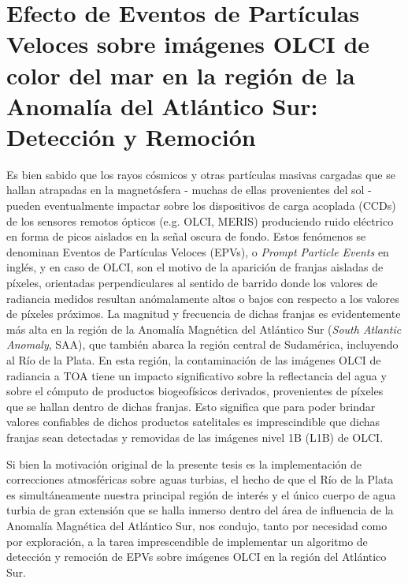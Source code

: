 \chapter[EPVs sobre imágenes OLCI en la SAA]{Efecto de Eventos de Partículas Veloces sobre imágenes OLCI de color del mar en la región de la Anomalía del Atlántico Sur: Detección y Remoción}
\label{ppe}

Es bien sabido que los rayos cósmicos y otras partículas masivas cargadas que se hallan atrapadas en la magnetósfera - muchas de ellas provenientes del sol - pueden eventualmente impactar sobre los dispositivos de carga acoplada (CCDs) de los sensores remotos ópticos (e.g. OLCI, MERIS) produciendo ruido eléctrico en forma de picos aislados en la señal oscura de fondo. Estos fenómenos se denominan Eventos de Partículas Veloces (EPVs), o \textit{Prompt Particle Events} en inglés, y en caso de OLCI, son el motivo de la aparición de franjas aisladas de píxeles, orientadas perpendiculares al sentido de barrido donde los valores de radiancia medidos resultan anómalamente altos o bajos con respecto a los valores de píxeles próximos. La magnitud y frecuencia de dichas franjas es evidentemente más alta en la región de la Anomalía Magnética del Atlántico Sur (\textit{South Atlantic Anomaly}, SAA), que también abarca la región central de Sudamérica, incluyendo al Río de la Plata. En esta región, la contaminación de las imágenes OLCI de radiancia a TOA tiene un impacto significativo sobre la reflectancia del agua y sobre el cómputo de productos biogeofísicos derivados, provenientes de píxeles que se hallan dentro de dichas franjas. Esto significa que para poder brindar valores confiables de dichos productos satelitales es imprescindible que dichas franjas sean detectadas y removidas de las imágenes nivel 1B (L1B) de OLCI.

Si bien la motivación original de la presente tesis es la implementación de correcciones atmosféricas sobre aguas turbias, el hecho de que el Río de la Plata es simultáneamente nuestra principal región de interés y el único cuerpo de agua turbia de gran extensión que se halla inmerso dentro del área de influencia de la Anomalía Magnética del Atlántico Sur, nos condujo, tanto por necesidad como por exploración, a la tarea imprescendible de implementar un algoritmo de detección y remoción de EPVs sobre imágenes OLCI en la región del Atlántico Sur.

